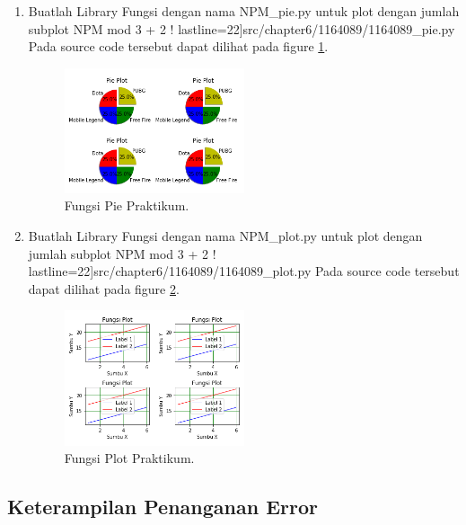 \begin{enumerate}
\item Buatlah Library Fungsi dengan nama NPM\_pie.py untuk plot dengan jumlah subplot NPM mod 3 + 2 !
	 lastline=22]{src/chapter6/1164089/1164089_pie.py}
	\subitem Pada source code tersebut dapat dilihat pada figure \ref{YNC6-13}.

	\begin{figure}[!htbp!]
		\centerline{\includegraphics[width=0.5\textwidth]{figures/chapter6/1164089/YNC6-13.png}}
		\caption{Fungsi Pie Praktikum.}
		\label{YNC6-13}
	\end{figure}

\item Buatlah Library Fungsi dengan nama NPM\_plot.py untuk plot dengan jumlah subplot NPM mod 3 + 2 !
	 lastline=22]{src/chapter6/1164089/1164089_plot.py}
	\subitem Pada source code tersebut dapat dilihat pada figure \ref{YNC6-14}.

	\begin{figure}[!htbp!]
		\centerline{\includegraphics[width=0.5\textwidth]{figures/chapter6/1164089/YNC6-14.png}}
		\caption{Fungsi Plot Praktikum.}
		\label{YNC6-14}
	\end{figure}

\end{enumerate}

\subsection{Keterampilan Penanganan Error}

